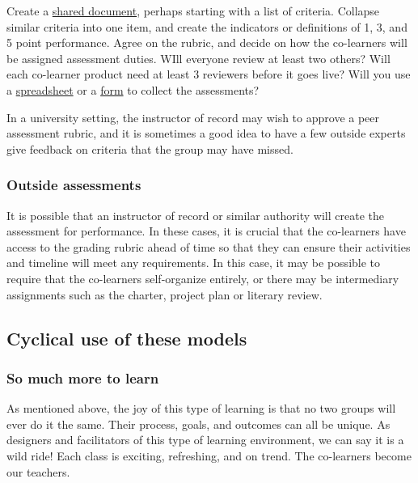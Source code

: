 Create a
\href{https://support.google.com/drive/bin/answer.py?hl=en\&answer=143213\&topic=21010\&ctx=topic}{shared
document}, perhaps starting with a list of criteria. Collapse similar
criteria into one item, and create the indicators or definitions of 1,
3, and 5 point performance. Agree on the rubric, and decide on how the
co-learners will be assigned assessment duties. WIll everyone review at
least two others? Will each co-learner product need at least 3 reviewers
before it goes live? Will you use a
\href{https://support.google.com/drive/bin/answer.py?hl=en\&answer=141195\&topic=20329\&ctx=topic}{spreadsheet}
or a
\href{http://support.google.com/drive/bin/answer.py?hl=en\&answer=87809}{form}
to collect the assessments?

In a university setting, the instructor of record may wish to approve a
peer assessment rubric, and it is sometimes a good idea to have a few
outside experts give feedback on criteria that the group may have
missed.

\subsubsection{Outside assessments}

It is possible that an instructor of record or similar authority will
create the assessment for performance. In these cases, it is crucial
that the co-learners have access to the grading rubric ahead of time so
that they can ensure their activities and timeline will meet any
requirements. In this case, it may be possible to require that the
co-learners self-organize entirely, or there may be intermediary
assignments such as the charter, project plan or literary review.

\subsection{Cyclical use of these models}

\subsubsection{So much more to learn}

As mentioned above, the joy of this type of learning is that no two
groups will ever do it the same. Their process, goals, and outcomes can
all be unique. As designers and facilitators of this type of learning
environment, we can say it is a wild ride! Each class is exciting,
refreshing, and on trend. The co-learners become our teachers.

